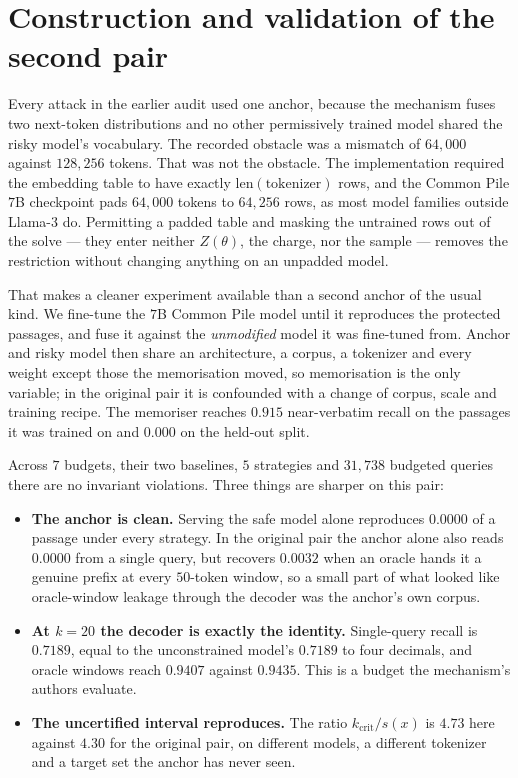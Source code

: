 \section{Construction and validation of the second pair}\label{app:second-anchor}

Every attack in the earlier audit used one anchor, because the mechanism fuses two next-token
distributions and no other permissively trained model shared the risky model's vocabulary. The
recorded obstacle was a mismatch of $64{,}000$ against $128{,}256$ tokens. That was not the
obstacle. The implementation required the embedding table to have exactly
$\mathrm{len}(\text{tokenizer})$ rows, and the Common Pile $7$B checkpoint pads $64{,}000$ tokens to
$64{,}256$ rows, as most model families outside Llama-3 do. Permitting a padded table and masking
the untrained rows out of the solve --- they enter neither $Z(\theta)$, the charge, nor the sample
--- removes the restriction without changing anything on an unpadded model.

That makes a cleaner experiment available than a second anchor of the usual kind. We fine-tune the
$7$B Common Pile model until it reproduces the protected passages, and fuse it against the
\emph{unmodified} model it was fine-tuned from. Anchor and risky model then share an architecture,
a corpus, a tokenizer and every weight except those the memorisation moved, so memorisation is the
only variable; in the original pair it is confounded with a change of corpus, scale and training
recipe. The memoriser reaches $0.915$ near-verbatim recall on the passages it was trained on and
$0.000$ on the held-out split.

Across $7$ budgets, their two baselines, $5$ strategies and $31{,}738$ budgeted queries there are no invariant
violations. Three things are sharper on this pair:

\begin{itemize}
\item \textbf{The anchor is clean.} Serving the safe model alone reproduces $0.0000$ of a passage
      under every strategy. In the original pair the anchor alone also reads $0.0000$ from a single
      query, but recovers $0.0032$ when an oracle hands it a genuine prefix at every $50$-token
      window, so a small part of what looked like oracle-window leakage through the decoder was the
      anchor's own corpus.
\item \textbf{At $k=20$ the decoder is exactly the identity.} Single-query recall is $0.7189$,
      equal to the unconstrained model's $0.7189$ to four decimals, and oracle windows reach
      $0.9407$ against $0.9435$. This is a budget the mechanism's authors evaluate.
\item \textbf{The uncertified interval reproduces.} The ratio $k_{\mathrm{crit}}/s(x)$ is $4.73$
      here against $4.30$ for the original pair, on different models, a different tokenizer and a
      target set the anchor has never seen.
\end{itemize}

